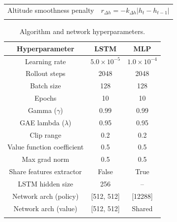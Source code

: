 \documentclass[pdflatex,sn-mathphys-num]{sn-jnl}%
\theoremstyle{thmstyleone}%
\theoremstyle{thmstyletwo}%
\theoremstyle{thmstylethree}%
\begin{document}
\begin{appendices}
\begin{table}[h]
\begin{tabular*}{\textwidth}{@{\extracolsep\fill}p{}p{}}
Altitude smoothness penalty
& $r_{\Delta h}=-k_{\Delta h}|h_t-h_{t-1}|$ \\
\botrule
\end{tabular*}
\end{table}


\begin{table}
  \centering
  \caption{Algorithm and network hyperparameters.}
  \label{tab:algo_net}
  \begin{tabular}{ccc}
    \toprule
    Hyperparameter & LSTM & MLP \\
    \midrule
    Learning rate & $5.0\times10^{-5}$ & $1.0\times10^{-4}$ \\
    Rollout steps & 2048 & 2048 \\
    Batch size & 128 & 128 \\
    Epochs & 10 & 10 \\
    Gamma ($\gamma$) & 0.99 & 0.99 \\
    GAE lambda ($\lambda$) & 0.95 & 0.95 \\
    Clip range & 0.2 & 0.2 \\
    Value function coefficient & 0.5 & 0.5 \\
    Max grad norm & 0.5 & 0.5 \\
    Share features extractor & False & True \\
    LSTM hidden size & 256 & -- \\
    Network arch (policy) & [512, 512] & [12288] \\
    Network arch (value) & [512, 512] & Shared \\
    \botrule
  \end{tabular}
\end{table}


\end{appendices}
\end{document}
